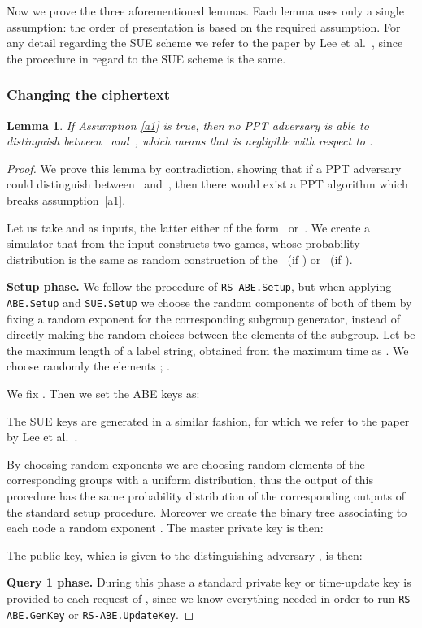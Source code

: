\documentclass[a4paper,10pt]{article}
\newtheorem{lemma}{Lemma}
\newcommand{\algorithm}[2]{\texttt{#1.#2}}
\newcommand{\randomchoose}[1]{We choose randomly the element\ifstrequal{#1}{s}{}{s} }
\newcommand{\game}[2]{}
\newcommand{\phase}[1]{\textbf{#1 phase.} \hspace{0pt}}
\newcommand{\disclaimerSUE}{The SUE keys are generated in a similar fashion, for which we refer to the paper by Lee et al.~\cite{lee2013RSABE}.

}
\begin{document}
	Now we prove the three aforementioned lemmas.
	Each lemma uses only a single assumption: the order of presentation is based on the required assumption.
	For any detail regarding the SUE scheme we refer to the paper by Lee et al.~\cite{lee2013RSABE}, since the procedure in regard to the SUE scheme is the same.
	\subsubsection{Changing the ciphertext}
	\begin{lemma}
		\label{lemma.g0}
		If Assumption \ref{a1} is true, then no PPT adversary  is able to distinguish between~\game{G}{0} and~\game{G}{1}, which means that  is negligible with respect to .
	\end{lemma}
	\begin{proof}
		We prove this lemma by contradiction, showing that if a PPT adversary  could distinguish between~\game{G}{0} and~\game{G}{1}, then there would exist a PPT algorithm  which breaks assumption~\ref{a1}.
	
	Let us take  and  as inputs, the latter either of the form~ or~.
	We create a simulator  that from the input constructs two games, whose probability distribution is the same as random construction of the~\game{G}{0} (if ) or~\game{G}{1} (if ).
	
	\phase{Setup}
	We follow the procedure of \algorithm{RS-ABE}{Setup}, but when applying \algorithm{ABE}{Setup} and \algorithm{SUE}{Setup} we choose the random components of both of them by fixing a random exponent for the corresponding subgroup generator, instead of directly making the random choices between the elements of the subgroup.
	Let  be the maximum length of a label string, obtained from the maximum time  as .
	\randomchoose{p}{
;
.
	}
	
	
	We fix . Then we set the ABE keys as:	
	
	\disclaimerSUE{}
	By choosing random exponents we are choosing random elements of the corresponding groups with a uniform distribution, thus the output of this procedure has the same probability distribution of the corresponding outputs of the standard setup procedure.
	Moreover we create the binary tree  associating to each node  a random exponent .
	The master private key is then:
	
	
	The public key, which is given to the distinguishing adversary , is then:
	
	
	\phase{Query 1}
	During this phase a standard private key or time-update key is provided to each request of , since we know everything needed in order to run \algorithm{RS-ABE}{GenKey} or \algorithm{RS-ABE}{UpdateKey}.
	

\end{proof}
\end{document}
